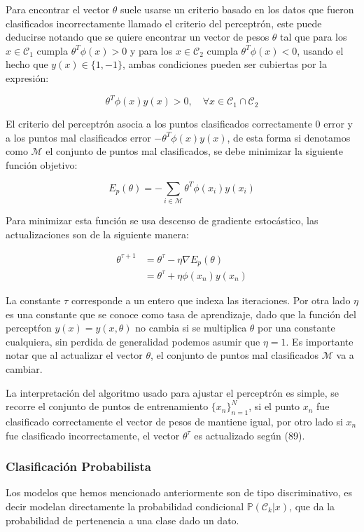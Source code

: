 Para encontrar el vector $\theta$ suele usarse un criterio basado en los datos que fueron clasificados incorrectamente llamado el criterio del perceptrón, este puede deducirse notando que se quiere encontrar un vector de pesos $\theta$ tal que para los $x\in\mathcal{C}_1$ cumpla $\theta^T\phi(x) > 0$ y para los $x\in\mathcal{C}_2$ cumpla $\theta^T\phi(x) < 0$, usando el hecho que $y(x)\in\{1,-1\}$, ambas condiciones pueden ser cubiertas por la expresión:

$$\theta^T\phi(x)y(x) > 0,\quad \forall x \in \mathcal{C}_1\cap\mathcal{C}_2$$

El criterio del perceptrón asocia a los puntos clasificados correctamente 0 error y a los puntos mal clasificados error $-\theta^T\phi(x)y(x)$, de esta forma si denotamos como $\mathcal{M}$ el conjunto de puntos mal clasificados, se debe minimizar la siguiente función objetivo:

$$ E_p(\theta) = -\sum_{i\in\mathcal{M}}\theta^T\phi(x_i)y(x_i) $$

Para minimizar esta función se usa descenso de gradiente estocástico, las actualizaciones son de la siguiente manera:

\begin{align}
    \theta^{\tau+1} &= \theta^\tau - \eta \nabla E_p(\theta)\\
    &= \theta^\tau + \eta \phi(x_n)y(x_n)
\end{align}

La constante $\tau$ corresponde a un entero que indexa las iteraciones. Por otra lado $\eta$ es una constante que se conoce como tasa de aprendizaje, dado que la función del perceptŕon $y(x)=y(x,\theta)$ no cambia si se multiplica $\theta$ por una constante cualquiera, sin perdida de generalidad podemos asumir que $\eta=1$. Es importante notar que al actualizar el vector $\theta$, el conjunto de puntos mal clasificados $\mathcal{M}$ va a cambiar.

La interpretación del algoritmo usado para ajustar el perceptrón es simple, se recorre el conjunto de puntos de entrenamiento $\{x_n\}_{n=1}^N$, si el punto $x_n$ fue clasificado correctamente el vector de pesos de mantiene igual, por otro lado si $x_n$ fue clasificado incorrectamente, el vector $\theta^\tau$ es actualizado según (89).
\newpage
\subsubsection{Clasificación Probabilista}

Los modelos que hemos mencionado anteriormente son de tipo discriminativo, es decir modelan directamente la probabilidad condicional $\mathbb{P}(\mathcal{C}_k|x)$, que da la probabilidad de pertenencia a una clase dado un dato.

